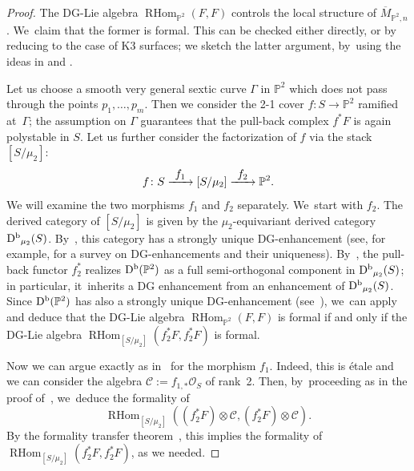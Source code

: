 \documentclass[11pt]{article}
\newcommand\To[1]{\mathchoice{\xrightarrow{\textstyle\kern4pt#1\kern3pt}}{\stackrel{#1}{\longrightarrow}}{}{}}
\newcommand{\PP}{{\mathbb P}}\let\P\PP
\newcommand\cC{\mathcal{C}}
\newcommand\cO{\mathcal{O}}
\DeclareMathOperator{\Db}{D^{\textup b}}
\DeclareMathOperator{\RHom}{RHom}
\theoremstyle{definition}
\begin{document}
\begin{proof}
The DG-Lie algebra $\RHom_{\PP^2}(F,F)$ controls the local structure of $\overline{M}_{\PP^2,n}$. We~claim that the former is formal.
This can be checked either directly, or by reducing to the case of K3 surfaces; we sketch the latter argument, by~using the ideas in \cite{BZ:Kuranishi} and \cite{BMM:Formality}.

Let us choose a smooth very general sextic curve $\mathsf{\Gamma}$ in $\PP^2$ which does not pass through the points $p_1,\dots,p_m$. Then we consider the 2-1 cover $f\colon S\to \PP^2$ ramified at~$\mathsf{\Gamma}$; the assumption on $\mathsf{\Gamma}$ guarantees that the pull-back complex $f^*F$ is again polystable in $S$.
Let us further consider the factorization of $f$ via the stack $\left[S/\mu_2\right]$:
\[
f\colon S \To{f_1} \left[S/\mu_2\right] \To{f_2} \PP^2.
\]
We will examine the two morphisms $f_1$ and $f_2$ separately. We~start with $f_2$.
The derived category of $\left[S/\mu_2\right]$ is given by the $\mu_2$-equivariant derived category $\Db_{\mu_2}(S)$.
By~\cite[Prop.\,6.10]{CanonacoStellari:Uniqueness}, this category has a strongly unique DG-enhancement (see, for example, \cite{CanonacoStellari:Tour} for a survey on DG-enhancements and their uniqueness).
By~\cite{PolVdB:equivariant}, the pull-back functor $f_2^*$ realizes $\Db(\PP^2)$ as a full semi-orthogonal component in $\Db_{\mu_2}(S)$; in particular, it~inherits a DG enhancement from an enhancement of $\Db_{\mu_2}(S)$.
Since $\Db(\PP^2)$ has also a strongly unique DG-enhancement (see~\cite{LO:Uniqueness}), we~can apply~\cite[Prop.\,2.13]{BZ:Kuranishi} and deduce that the DG-Lie algebra $\RHom_{\PP^2}(F,F)$ is formal if and only if the DG-Lie algebra $\RHom_{[S/\mu_2]}(f_2^*F,f_2^*F)$ is formal.

Now we can argue exactly as in~\cite{BMM:Formality} for the morphism $f_1$.
Indeed, this is étale and we can consider the algebra $\cC:=f_{1,*}\cO_S$ of rank~2.
Then, by~proceeding as in the proof of~\cite[Th.\,5.3]{BMM:Formality}, we~deduce the formality of
\[
\RHom_{[S/\mu_2]}((f_2^*F)\otimes\cC,(f_2^*F)\otimes\cC).
\]
By the formality transfer theorem~\cite[Th.\,3.4]{Manetti:FormalityCriteria}, this implies the formality of $\RHom_{[S/\mu_2]}(f_2^*F,f_2^*F)$, as we needed.
\end{proof}
\end{document}
